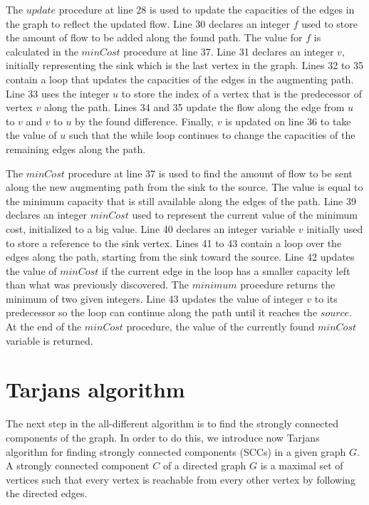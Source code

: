 \documentclass{l4proj}
\begin{document}
\noindent The $update$ procedure at line 28 is used to update the capacities of the edges in the graph to reflect the updated flow. Line 30 declares an integer $f$ used to store the amount of flow to be added along the found path. The value for $f$ is calculated in the $minCost$ procedure at line 37. Line 31 declares an integer $v$, initially representing the sink which is the last vertex in the graph. Lines 32 to 35 contain a loop that updates the capacities of the edges in the augmenting path. Line 33 uses the integer $u$ to store the index of a vertex that is the predecessor of vertex $v$ along the path. Lines 34 and 35 update the flow along the edge from $u$ to $v$ and $v$ to $u$ by the found difference. Finally, $v$ is updated on line 36 to take the value of $u$ such that the while loop continues to change the capacities of the remaining edges along the path.

\noindent The $minCost$ procedure at line 37 is used to find the amount of flow to be sent along the new augmenting path from the sink to the source. The value is equal to the minimum capacity that is still available along the edges of the path. Line 39 declares an integer $minCost$ used to represent the current value of the minimum cost, initialized to a big value. Line 40 declares an integer variable $v$ initially used to store a reference to the sink vertex. Lines 41 to 43 contain a loop over the edges along the path, starting from the sink toward the source. Line 42 updates the value of $minCost$ if the current edge in the loop has a smaller capacity left than what was previously discovered. The $minimum$ procedure returns the minimum of two given integers. Line 43 updates the value of integer $v$ to its predecessor so the loop can continue along the path until it reaches the $source$. At the end of the $minCost$ procedure, the value of the currently found $minCost$ variable is returned.

\newpage

\section{Tarjan\textquotesingle s algorithm}
\label{tarjansection}
\noindent The next step in the all-different algorithm is to find the strongly connected components of the graph. In order to do this, we introduce now Tarjan\textquotesingle s algorithm \cite{tarjan1972depth} for finding strongly connected components (SCCs) in a given graph $G$. A strongly connected component $C$ of a directed graph $G$ is a maximal set of vertices such that every vertex is reachable from every other vertex by following the directed edges.
\end{document}

